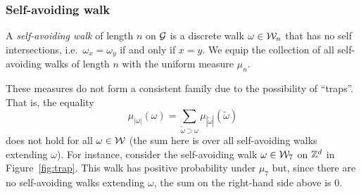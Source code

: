 

\subsubsection{Self-avoiding walk}

A \emph{self-avoiding walk} of length $n$ on $\mathcal{G}$ is a discrete walk $\omega\in\mathcal{W}_n$
that has no self intersections, i.e.\ $\omega_x = \omega_y$ if and only if $x = y$.
We equip the collection of all self-avoiding walks of length $n$ with the uniform measure $\mu_n$.

These measures do not form a consistent family due to the possibility of ``traps''.
That is, the equality
\begin{equation}
\mu_{|\omega|}(\omega) = \sum_{\tilde\omega \supset \omega} \mu_{|\tilde\omega|}(\tilde\omega)
\end{equation}
does not hold for all $\omega\in\mathcal{W}$ (the sum here is over all self-avoiding walks extending
$\omega$).
For instance, consider the self-avoiding walk $\omega\in\mathcal{W}_7$ on ${ {{\mathbb Z}}^d }$ in
Figure~\ref{fig:trap}.
This walk has positive probability under $\mu_7$ but,
since there are no self-avoiding walks extending $\omega$, the sum on the right-hand side
above is $0$.

